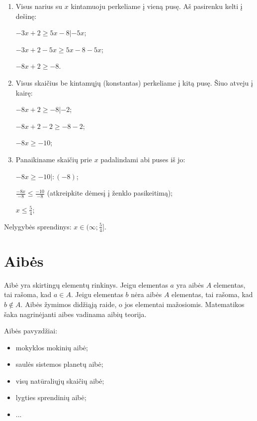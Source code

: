 \documentclass[a4paper]{article}
\begin{document}
\begin{enumerate}
      \item Visus narius su $x$ kintamuoju perkeliame į vieną pusę. Aš
            pasirenku kelti į dešinę:

            $-3x+2\geq 5x-8 | -5x$;

            $-3x+2-5x \geq 5x-8-5x$;

            $-8x+2 \geq -8$.

      \item Visus skaičius be kintamųjų (konstantas) perkeliame į kitą pusę.
            Šiuo atveju į kairę:

            $-8x+2 \geq -8|-2$;

            $-8x+2-2 \geq -8-2$;

            $-8x \geq -10$;

      \item Panaikiname skaičių prie $x$ padalindami abi puses iš jo:

            $-8x \geq -10|:(-8)$;

            $\frac{-8x}{-8} \leq \frac{-10}{-8}$ (atkreipkite dėmesį į ženklo
            pasikeitimą);

            $x \leq \frac{5}{4} $;

\end{enumerate}

Nelygybės sprendinys: $x\in (\infty;\frac{5}{4}]$.

\section{Aibės}

Aibė yra skirtingų elementų rinkinys. Jeigu elementas $a$ yra aibės $A$
elementas, tai rašoma, kad $a \in A$. Jeigu elementas $b$ nėra aibės $A$
elementas, tai rašoma, kad $b \notin A$. Aibės žymimos didžiąją raide, o jos
elementai mažosiomis. Matematikos šaka nagrinėjanti aibes
vadinama aibių teorija.

Aibės pavyzdžiai:

\begin{itemize}
      \item mokyklos mokinių aibė;
      \item saulės sistemos planetų aibė;
      \item visų natūraliųjų skaičių aibė;
      \item lygties sprendinių aibė;
      \item ...
\end{itemize}
\end{document}
